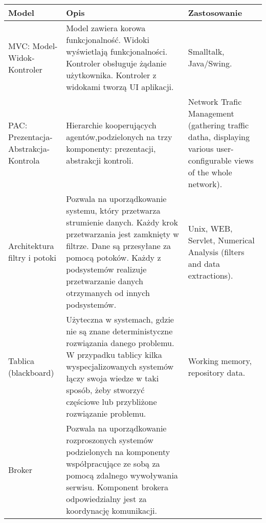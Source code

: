 \documentclass[a4paper]{article}
\begin{document}
    \begin{table}[H]
        \begin{center}
            \begin{tabular}{ p{} p{} p{}}
                \toprule
                Model & Opis & Zastosowanie \\
                \toprule

                MVC: Model-Widok-Kontroler
                &
                Model zawiera korowa funkcjonalność. Widoki wyświetlają funkcjonalności. Kontroler obsługuje żądanie użytkownika. Kontroler z widokami tworzą UI aplikacji.
                &
                Smalltalk, Java/Swing. \\

                \cmidrule(l){1-3}

                PAC: Prezentacja-Abstrakcja-Kontrola
                &
                Hierarchie kooperujących agentów,podzielonych na trzy komponenty: prezentacji, abstrakcji kontroli.
                &
                Network Trafic Management (gathering traffic datha, displaying various user-configurable
                views of the whole network). \\

                \cmidrule(l){1-3}

                Architektura filtry i potoki
                &
                Pozwala na uporządkowanie systemu, który przetwarza strumienie danych. Każdy krok przetwarzania jest zamknięty w filtrze.
                Dane są przesyłane za pomocą potoków. Każdy z podsystemów realizuje przetwarzanie danych otrzymanych od innych podsystemów.
                &
                Unix, WEB, Servlet, Numerical Analysis (filters and data extractions). \\

                \cmidrule(l){1-3}

                Tablica (blackboard)
                &
                Użyteczna w systemach, gdzie nie są znane deterministyczne rozwiązania danego problemu. W przypadku tablicy kilka wyspecjalizowanych
                systemów łączy swoja wiedze w taki sposób, żeby stworzyć częściowe lub przybliżone rozwiązanie problemu.
                &
                Working memory, repository data. \\

                \cmidrule(l){1-3}

                Broker
                &
                Pozwala na uporządkowanie rozproszonych systemów podzielonych na komponenty współpracujące ze sobą za pomocą zdalnego wywoływania
                serwisu. Komponent brokera odpowiedzialny jest za koordynację komunikacji.
                & \\


\end{tabular}
\end{center}
\end{table}
\end{document}
